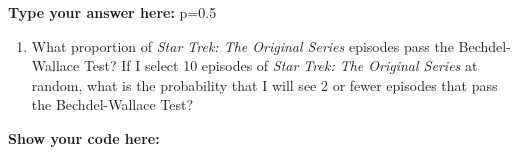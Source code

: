 \documentclass[
]{article}
\newenvironment{Shaded}{\begin{snugshade}}{\end{snugshade}}
\newcommand{\CommentTok}[1]{\textcolor[rgb]{0.56,0.35,0.01}{\textit{#1}}}
\newcommand{\KeywordTok}[1]{\textcolor[rgb]{0.13,0.29,0.53}{\textbf{#1}}}
\newcommand{\NormalTok}[1]{#1}
\newcommand{\OperatorTok}[1]{\textcolor[rgb]{0.81,0.36,0.00}{\textbf{#1}}}
\newcommand{\StringTok}[1]{\textcolor[rgb]{0.31,0.60,0.02}{#1}}
\providecommand{\tightlist}{%
  \setlength{\itemsep}{0pt}\setlength{\parskip}{0pt}}
\begin{document}
\textbf{Type your answer here:} p=0.5

\begin{enumerate}
\def\labelenumi{\alph{enumi}.}
\setcounter{enumi}{2}
\tightlist
\item
  What proportion of \emph{Star Trek: The Original Series} episodes pass
  the Bechdel-Wallace Test? If I select 10 episodes of \emph{Star Trek:
  The Original Series} at random, what is the probability that I will
  see 2 or fewer episodes that pass the Bechdel-Wallace Test?
\end{enumerate}

\textbf{Show your code here:}

\begin{Shaded}
\end{Shaded}
\end{document}
